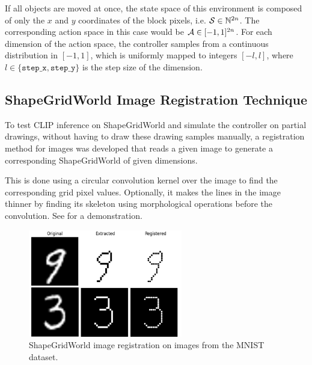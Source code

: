 If all objects are moved at once, the state space of this environment is composed of only the \(x\) and \(y\) coordinates of the block pixels, i.e. \(\mathcal{S} \in \mathbb{N}^{2 n}\).
The corresponding action space in this case would be \(\mathcal{A} \in [-1, 1]^{2 n}\).
For each dimension of the action space, the controller samples from a continuous distribution in \([-1, 1]\), which is uniformly mapped to integers \([-l, l]\), where \(l \in \{\texttt{step\_x}, \texttt{step\_y}\}\) is the step size of the dimension.

\subsection{ShapeGridWorld Image Registration Technique}
\label{sec:sgw-registration}

To test CLIP inference on ShapeGridWorld and simulate the controller on partial drawings, without having to draw these drawing samples manually, a registration method for images was developed that reads a given image to generate a corresponding ShapeGridWorld of given dimensions.

This is done using a circular convolution kernel over the image to find the corresponding grid pixel values.
Optionally, it makes the lines in the image thinner by finding its skeleton using morphological operations before the convolution.
See  for a demonstration.

\vspace{10pt}
\begin{figure}[h]
    \centering
    \includegraphics[width=0.6\textwidth]{images/grid_registration.png}
    \caption{ShapeGridWorld image registration on images from the MNIST dataset.}
    \label{fig:sgw-registration}
\end{figure}

